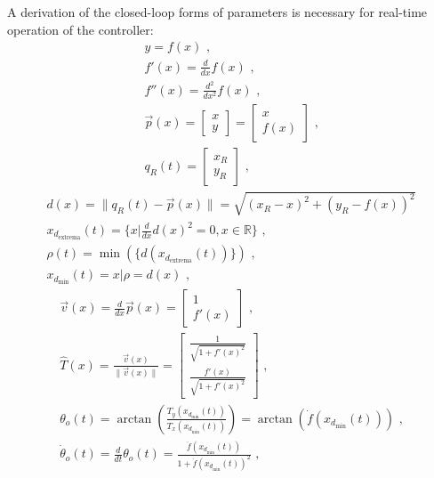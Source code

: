 \documentclass[11pt, letterpaper]{article}
\numberwithin{equation}{section}
\begin{document}
A derivation of the closed-loop forms of parameters is necessary for real-time operation of the controller:
\begin{gather}
    y = f(x)  \text{ ,} \\
    f'(x) = \frac{d}{dx} f(x) \text{ ,} \\
    f''(x) = \frac{d^2}{dx^2} f(x) \text{ ,} \\
    \overrightarrow{p}(x) = \begin{bmatrix} x \\ y \end{bmatrix} = \begin{bmatrix} x \\ f(x) \end{bmatrix} \text{ ,} \\
    q_R(t) = \begin{bmatrix} x_R \\ y_R \end{bmatrix} \text{ ,}
\end{gather}
\begin{gather}
    d(x) = \| q_R(t) - \overrightarrow{p}(x) \| = \sqrt{(x_R - x)^2 + (y_R - f(x))^2} \\
    x_{d_\text{extrema}}(t) = \{x | \frac{d}{dx} d(x)^2 = 0, x \in \mathbb{R} \}  \text{ ,} \\
    \rho(t) = \min (\{d(x_{d_\text{extrema}}(t))\}) \text{ ,} \\
    x_{d_{\min}}(t) = x | \rho = d(x) \text{ ,}
\end{gather}
\begin{gather}
    \overrightarrow{v}(x) = \frac{d}{dx}\overrightarrow{p}(x) = \begin{bmatrix} 1 \\ f'(x) \end{bmatrix} \text{ ,} \\
    \hat{T}(x) = \frac{\overrightarrow{v}(x)}{\| \overrightarrow{v}(x) \|}
               = \begin{bmatrix}
                 \frac{1}{\sqrt{1 + f'(x)^2}} \\[1em]
                 \frac{f'(x)}{\sqrt{1 + f'(x)^2}}
                 \end{bmatrix} \text{ ,} \\
    \theta_o(t) = \arctan(\frac{T_y(x_{d_{\min}}(t))}{T_x(x_{d_{\min}}(t))}) = \arctan(\dot{f}(x_{d_{\min}}(t))) \text{ ,} \\
    \dot{\theta}_o(t) = \frac{d}{dt}\theta_o(t) = \frac{\ddot{f}(x_{d_{\min}}(t))}{1 + \dot{f}(x_{d_{\min}}(t))^2} \text{ ,}
\end{gather}
\end{document}
